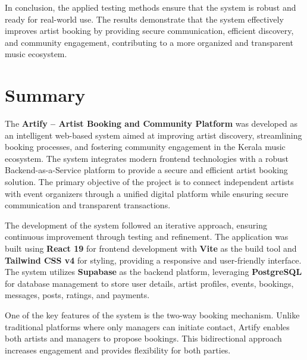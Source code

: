 \documentclass[12pt,a4paper]{report}
\begin{document}
In conclusion, the applied testing methods ensure that the system is robust and ready for real-world use. The results demonstrate that the system effectively improves artist booking by providing secure communication, efficient discovery, and community engagement, contributing to a more organized and transparent music ecosystem.

\setcounter{chapter}{7}
\clearpage
\thispagestyle{empty}

\noindent
{}

\clearpage
{}
\setcounter{section}{0}

\section{Summary}

The \textbf{Artify -- Artist Booking and Community Platform} was developed as an intelligent web-based system aimed at improving artist discovery, streamlining booking processes, and fostering community engagement in the Kerala music ecosystem. The system integrates modern frontend technologies with a robust Backend-as-a-Service platform to provide a secure and efficient artist booking solution. The primary objective of the project is to connect independent artists with event organizers through a unified digital platform while ensuring secure communication and transparent transactions.

The development of the system followed an iterative approach, ensuring continuous improvement through testing and refinement. The application was built using \textbf{React 19} for frontend development with \textbf{Vite} as the build tool and \textbf{Tailwind CSS v4} for styling, providing a responsive and user-friendly interface. The system utilizes \textbf{Supabase} as the backend platform, leveraging \textbf{PostgreSQL} for database management to store user details, artist profiles, events, bookings, messages, posts, ratings, and payments.

One of the key features of the system is the two-way booking mechanism. Unlike traditional platforms where only managers can initiate contact, Artify enables both artists and managers to propose bookings. This bidirectional approach increases engagement and provides flexibility for both parties.
\end{document}
